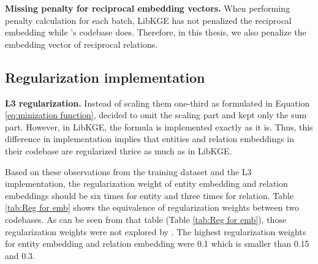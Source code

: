 \noindent\textbf{Missing penalty for reciprocal embedding vectors.} When performing penalty calculation for each batch, LibKGE has not penalized the reciprocal embedding while \citet{chen2021relation}'s codebase does. Therefore, in this thesis, we also penalize the embedding vector of reciprocal relations.


\subsection{Regularization implementation}


\noindent\textbf{L3 regularization.} Instead of scaling them one-third as formulated in Equation \ref{eq:minization function}, \citet{chen2021relation} decided to omit the scaling part and kept only the sum part. However, in LibKGE, the formula is implemented exactly as it is. Thus, this difference in implementation implies that entities and relation embeddings in their codebase are regularized thrice as much as in LibKGE.

Based on these observations from the training dataset and the L3 implementation, the regularization weight of entity embedding and relation embeddings should be six times for entity and three times for relation. Table \ref{tab:Reg for emb} shows the equivalence of regularization weights between two codebases. As can be seen from that table (Table \ref{tab:Reg for emb}), those regularization weights were not explored by \cite{Ruffinelli2020You}. The highest regularization weights for entity embedding and relation embedding were 0.1 \cite{Ruffinelli2020You} which is smaller than 0.15 and 0.3.
\newline

